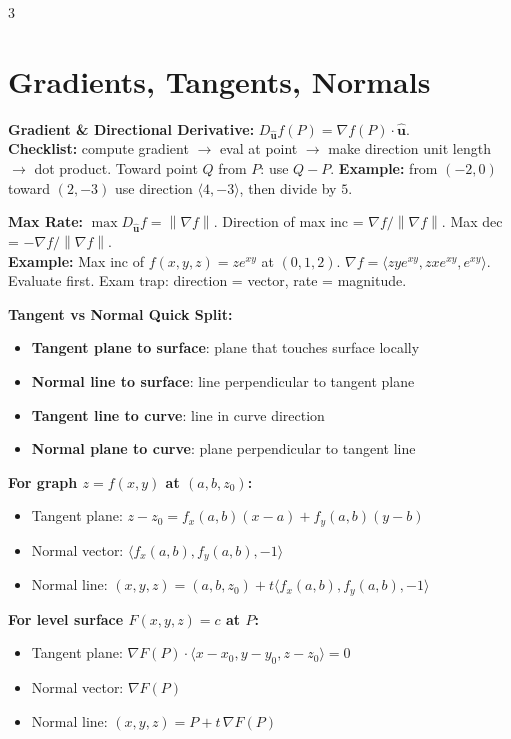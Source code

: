 \documentclass[12pt, landscape]{article}
\newcommand{\uvct}[1]{\bm{\hat{#1}}}
\newcommand{\norm}[1]{\left\lVert#1\right\rVert}
\newcommand{\dotp}{\!\cdot\!}
\newcommand{\grad}{\nabla}
\begin{document}
\begin{multicols}{3}
		\section{Gradients, Tangents, Normals}
		\textbf{Gradient \& Directional Derivative:}
		$D_{\uvct u}f(P)=\grad f(P)\dotp \uvct u$.\\
		\textbf{Checklist:} compute gradient $\to$ eval at point $\to$ make direction unit length $\to$ dot product. Toward point $Q$ from $P$: use $Q-P$. \textbf{Example:} from $(-2,0)$ toward $(2,-3)$ use direction $\langle 4,-3\rangle$, then divide by $5$.
		
		\textbf{Max Rate:} $\max D_{\uvct u}f=\norm{\grad f}$.
		Direction of max inc = $\grad f/\norm{\grad f}$. Max dec = $-\grad f/\norm{\grad f}$.\\
		\textbf{Example:} Max inc of $f(x,y,z)=ze^{xy}$ at $(0,1,2)$. $\grad f=\langle zye^{xy},zxe^{xy},e^{xy}\rangle$. Evaluate first. Exam trap: direction = vector, rate = magnitude.
		
		\textbf{Tangent vs Normal Quick Split:}
		\begin{itemize}
			\item \textbf{Tangent plane to surface}: plane that touches surface locally
			\item \textbf{Normal line to surface}: line perpendicular to tangent plane
			\item \textbf{Tangent line to curve}: line in curve direction
			\item \textbf{Normal plane to curve}: plane perpendicular to tangent line
		\end{itemize}
		
		\textbf{For graph $z=f(x,y)$ at $(a,b,z_0)$:}
		\begin{itemize}
			\item Tangent plane: $z-z_0=f_x(a,b)(x-a)+f_y(a,b)(y-b)$
			\item Normal vector: $\langle f_x(a,b),f_y(a,b),-1\rangle$
			\item Normal line: $(x,y,z)=(a,b,z_0)+t\langle f_x(a,b),f_y(a,b),-1\rangle$
		\end{itemize}
		
		\textbf{For level surface $F(x,y,z)=c$ at $P$:}
		\begin{itemize}
			\item Tangent plane: $\grad F(P)\dotp\langle x-x_0,y-y_0,z-z_0\rangle=0$
			\item Normal vector: $\grad F(P)$
			\item Normal line: $(x,y,z)=P+t\,\grad F(P)$
		\end{itemize}
		

\end{multicols}
\end{document}
